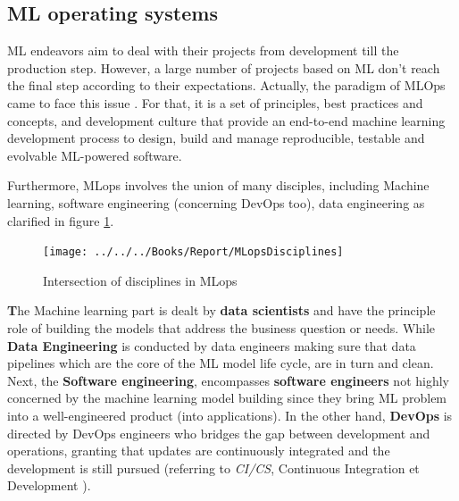 \documentclass[12pt,a4paper]{report}
\begin{document}
\subsection{{\large  ML operating systems}} 
ML endeavors aim to deal with their projects from development till the production step. However, a large number of projects based on ML don't reach the final step according to their expectations. Actually, the paradigm of MLOps came to face this issue \cite{kreuzberger2023machine}. For that, it is a set of principles, best practices and concepts, and development culture that provide an end-to-end machine learning development process to design, build and manage reproducible, testable and evolvable ML-powered software. 

Furthermore, MLops involves the union of many disciples, including Machine learning, software engineering (concerning DevOps too), data engineering as clarified in figure \ref{fig:mlopsdisciplines}.
\begin{figure}[h!]
	\centering
	\texttt{[image: ../../../Books/Report/MLopsDisciplines]}
	\caption{Intersection of disciplines in MLops}
	\label{fig:mlopsdisciplines}
\end{figure} 

\textbf The {Machine learning part} is dealt by \textbf{data scientists} and have the principle role of building the models that address the business question or needs. While \textbf{Data Engineering} is conducted by data engineers making sure that data pipelines which are the core of the ML model life cycle, are in turn and clean. Next, the \textbf{Software engineering}, encompasses \textbf{software engineers} not highly concerned by the machine learning model building since they bring ML problem into a well-engineered product (into applications). 
In the other hand, \textbf{DevOps} is directed by DevOps engineers who bridges the gap between development and operations, granting that updates are continuously integrated and the development is still pursued (referring to \textit{CI/CS}, Continuous Integration et Development ). \\
\end{document}

